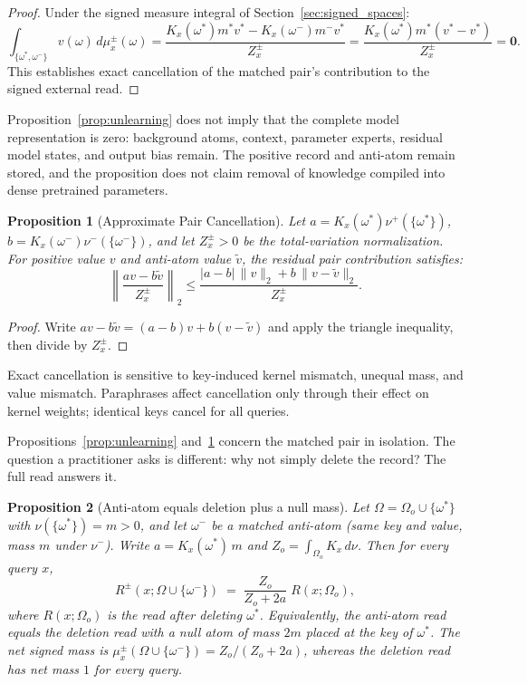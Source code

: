 \documentclass[preprint,12pt]{elsarticle}
\newtheorem{proposition}{Proposition}
\newcommand{\Om}{\Omega}
\newif\ifmarkchanges
\newcommand{\revii}[1]{\ifmarkchanges{\color{blue}#1}\else#1\fi} %
\providecommand{\DIFaddbegin}{} %
\providecommand{\DIFaddend}{} %
\providecommand{\DIFaddincludegraphics}[2][]{{\color{blue}\fbox{\DIFOincludegraphics[#1]{#2}}}} %
\DeclareRobustCommand{\DIFaddbegin}{\DIFOaddbegin \let\includegraphics\DIFaddincludegraphics} %
\DeclareRobustCommand{\DIFaddend}{\DIFOaddend \let\includegraphics\DIFOincludegraphics} %
\begin{document}
\begin{proof}
Under the signed measure integral of Section~\ref{sec:signed_spaces}:
\[
  \int_{\{\omega^*, \omega^-\}} v(\omega)\, d\mu_x^{\pm}(\omega) = \frac{K_x(\omega^*) m^* v^* - K_x(\omega^-) m^- v^*}{Z_x^{\pm}} = \frac{K_x(\omega^*) m^* (v^* - v^*)}{Z_x^{\pm}} = \mathbf{0}.
\]
This establishes exact cancellation of the matched pair's contribution to the signed external read. \qedhere
\end{proof}

Proposition~\ref{prop:unlearning} does not imply that the complete model representation is zero: background atoms, context, parameter experts, residual model states, and output bias remain. The positive record and anti-atom remain stored, and the proposition does not claim removal of knowledge compiled into dense pretrained parameters.

\begin{proposition}[Approximate Pair Cancellation]
\label{prop:approximate_cancellation}
Let $a=K_x(\omega^*)\nu^+(\{\omega^*\})$, $b=K_x(\omega^-)\nu^-(\{\omega^-\})$, and let $Z_x^{\pm}>0$ be the total-variation normalization. For positive value $v$ and anti-atom value $\tilde v$, the residual pair contribution satisfies:
\[
  \left\|\frac{a v-b\tilde v}{Z_x^{\pm}}\right\|_2
  \le \frac{|a-b|\,\|v\|_2+b\,\|v-\tilde v\|_2}{Z_x^{\pm}}.
\]
\end{proposition}

\begin{proof}
Write $a v-b\tilde v=(a-b)v+b(v-\tilde v)$ and apply the triangle inequality, then divide by $Z_x^{\pm}$. \qedhere
\end{proof}

Exact cancellation is sensitive to key-induced kernel mismatch, unequal mass, and value mismatch. Paraphrases affect cancellation only through their effect on kernel weights; identical keys cancel for all queries.

Propositions~\ref{prop:unlearning} and~\ref{prop:approximate_cancellation} concern the matched pair in isolation. The question a practitioner asks is different: why not simply delete the record? The full read answers it.

\begin{proposition}[Anti-atom equals deletion plus a null mass]
\label{prop:anti_vs_delete}
Let $\Om=\Om_o\cup\{\omega^*\}$ with $\nu(\{\omega^*\})=m>0$, and let $\omega^-$ be a matched anti-atom (same key and value, mass $m$ under $\nu^-$). Write $a=K_x(\omega^*)\,m$ and $Z_o=\int_{\Om_o}K_x\,d\nu$. Then for every query $x$,
\[
  R^{\pm}(x;\Om\cup\{\omega^-\}) \;=\; \frac{Z_o}{Z_o+2a}\;R(x;\Om_o),
\]
where $R(x;\Om_o)$ is the read after deleting $\omega^*$. Equivalently, the anti-atom read equals the deletion read with a null atom of mass $2m$ placed at the key of $\omega^*$. \DIFaddbegin \revii{The net signed mass is $\mu_x^{\pm}(\Om\cup\{\omega^-\})=Z_o/(Z_o+2a)$, whereas the deletion read has net mass $1$ for every query.}
\DIFaddend \end{proposition}
\end{document}
